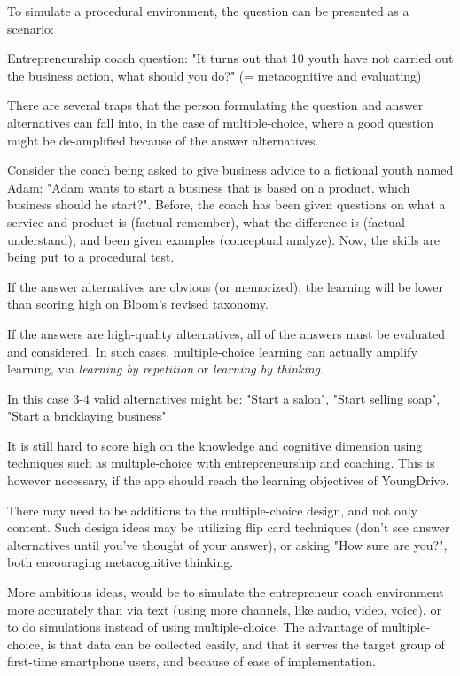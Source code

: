   To simulate a procedural environment, the question can be presented as a scenario:

  Entrepreneurship coach question: "It turns out that 10 youth have not carried out the business action, what should you do?" (= metacognitive and evaluating)

  There are several traps that the person formulating the question and answer alternatives can fall into, in the case of multiple-choice, where a good question might be de-amplified because of the answer alternatives.

  Consider the coach being asked to give business advice to a fictional youth named Adam: "Adam wants to start a business that is based on a product. which business should he start?". Before, the coach has been given questions on what a service and product is (factual remember), what the difference is (factual understand), and been given examples (conceptual analyze). Now, the skills are being put to a procedural test.

  If the answer alternatives are obvious (or memorized), the learning will be lower than scoring high on Bloom's revised taxonomy.

  If the answers are high-quality alternatives, all of the answers must be evaluated and considered. In such cases, multiple-choice learning can actually amplify learning, via \textit{learning by repetition} or \textit{learning by thinking}.

  In this case 3-4 valid alternatives might be: "Start a salon", "Start selling soap", "Start a bricklaying business".

  It is still hard to score high on the knowledge and cognitive dimension using techniques such as multiple-choice with entrepreneurship and coaching. This is however necessary, if the app should reach the learning objectives of YoungDrive.

  There may need to be additions to the multiple-choice design, and not only content. Such design ideas may be utilizing flip card techniques (don't see answer alternatives until you've thought of your answer), or asking "How sure are you?", both encouraging metacognitive thinking.

  More ambitious ideas, would be to simulate the entrepreneur coach environment more accurately than via text (using more channels, like audio, video, voice), or to do simulations instead of using multiple-choice. The advantage of multiple-choice, is that data can be collected easily, and that it serves the target group of first-time smartphone users, and because of ease of implementation.

